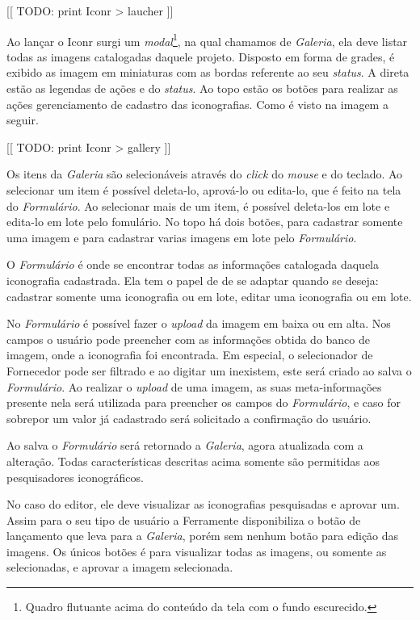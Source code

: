 \documentclass[
  12pt,				%
  openany,
  oneside,
  a4paper,			%
  english,			%
  brazil
]{article}
\numberwithin{figure}{section}
\numberwithin{table}{section}
\begin{document}
[[ TODO: print Iconr > laucher ]] 

Ao lançar o Iconr surgi um \textit{modal}\footnote{Quadro flutuante acima do conteúdo da tela com o fundo escurecido.}, na qual chamamos de \textit{Galeria}, ela deve listar todas as imagens catalogadas daquele projeto. Disposto em forma de grades, é exibido as imagem em miniaturas com as bordas referente ao seu \textit{status}. A direta estão as legendas de ações e do \textit{status}. Ao topo estão os botões para realizar as ações gerenciamento de cadastro das iconografias. Como é visto na imagem a seguir.

[[ TODO: print Iconr > gallery ]] 

Os itens da \textit{Galeria} são selecionáveis através do \textit{click} do \textit{mouse} e do teclado. Ao selecionar um item é possível deleta-lo, aprová-lo ou edita-lo, que é feito na tela do \textit{Formulário}. Ao selecionar mais de um item, é possível deleta-los em lote e edita-lo em lote pelo fomulário. No topo há dois botões,  para cadastrar somente uma imagem e para cadastrar varias imagens em lote pelo \textit{Formulário}.

O \textit{Formulário} é onde se encontrar todas as informações catalogada daquela iconografia cadastrada. Ela tem o papel de de se adaptar quando se deseja: cadastrar somente uma iconografia ou em lote, editar uma iconografia ou em lote.

No \textit{Formulário} é possível fazer o \textit{upload} da imagem em baixa ou em alta. Nos campos o usuário pode preencher com as informações obtida do banco de imagem, onde a iconografia foi encontrada. Em especial, o selecionador de Fornecedor pode ser filtrado e ao digitar um inexistem, este será criado ao salva o \textit{Formulário}. Ao realizar o \textit{upload} de uma imagem, as suas meta-informações presente nela será utilizada para preencher os campos do \textit{Formulário}, e caso for sobrepor um valor já cadastrado será solicitado a confirmação do usuário.

Ao salva o \textit{Formulário} será retornado a \textit{Galeria}, agora atualizada com a alteração. Todas características descritas acima somente são permitidas aos pesquisadores iconográficos.

No caso do editor, ele deve visualizar as iconografias pesquisadas e aprovar um. Assim para o seu tipo de usuário a Ferramente disponibiliza o botão de lançamento que leva para a \textit{Galeria}, porém sem nenhum botão para edição das imagens. Os únicos botões é para visualizar todas as imagens, ou somente as selecionadas, e aprovar a imagem selecionada.
\end{document}
